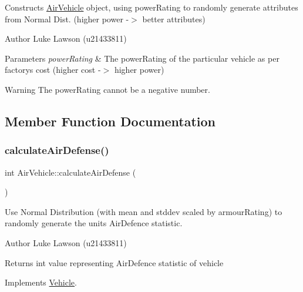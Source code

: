 Constructs \mbox{\hyperlink{class_air_vehicle}{Air\+Vehicle}} object, using power\+Rating to randomly generate attributes from Normal Dist. (higher power -\/$>$ better attributes) 

\begin{DoxyAuthor}{Author}
Luke Lawson (u21433811) 
\end{DoxyAuthor}

\begin{DoxyParams}{Parameters}
{\em power\+Rating} & The power\+Rating of the particular vehicle as per factory\textquotesingle{}s cost (higher cost -\/$>$ higher power) \\
\hline
\end{DoxyParams}
\begin{DoxyWarning}{Warning}
The power\+Rating cannot be a negative number. 
\end{DoxyWarning}


\subsection{Member Function Documentation}
\mbox{\label{class_air_vehicle_ade9dabaec365370683599f3df95189c2}} 
\subsubsection{\texorpdfstring{calculateAirDefense()}{calculateAirDefense()}}
{\footnotesize\ttfamily int Air\+Vehicle\+::calculate\+Air\+Defense (\begin{DoxyParamCaption}{ }\end{DoxyParamCaption})\hspace{0.3cm}{\ttfamily [virtual]}}



Use Normal Distribution (with mean and stddev scaled by armour\+Rating) to randomly generate the unit\textquotesingle{}s Air\+Defence statistic. 

\begin{DoxyAuthor}{Author}
Luke Lawson (u21433811) 
\end{DoxyAuthor}
\begin{DoxyReturn}{Returns}
int value representing Air\+Defence statistic of vehicle 
\end{DoxyReturn}


Implements \mbox{\hyperlink{class_vehicle_ae87cbec24f436b431fbed096024c41c9}{Vehicle}}.

